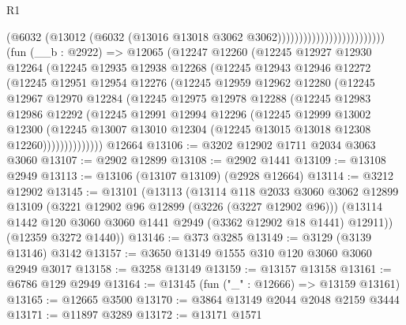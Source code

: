 \begin{lexlean}{R1}
\begin{coremodule}
                                              (@6032
                                                (@13012
                                                  (@6032
                                                    (@13016
                                                      @13018
                                                      @3062
                                                      @3062)))))))))))))))))))))))))
    (fun (__b : @2922) =>
    @12065
      (@12247
        @12260
        (@12245
          @12927
          @12930
          @12264
          (@12245
            @12935
            @12938
            @12268
            (@12245
              @12943
              @12946
              @12272
              (@12245
                @12951
                @12954
                @12276
                (@12245
                  @12959
                  @12962
                  @12280
                  (@12245
                    @12967
                    @12970
                    @12284
                    (@12245
                      @12975
                      @12978
                      @12288
                      (@12245
                        @12983
                        @12986
                        @12292
                        (@12245
                          @12991
                          @12994
                          @12296
                          (@12245
                            @12999
                            @13002
                            @12300
                            (@12245
                              @13007
                              @13010
                              @12304
                              (@12245 @13015 @13018 @12308 @12260))))))))))))))
    @12664
@13106 := @3202 @12902 @1711 @2034 @3063 @3060
@13107 := @2902 @12899
@13108 := @2902 @1441
@13109 := @13108 @2949
@13113 := @13106 (@13107 @13109) (@2928 @12664)
@13114 := @3212 @12902
@13145 := @13101
    (@13113
      (@13114
        @118
        @2033
        @3060
        @3062
        @12899
        @13109
        (@3221 @12902 @96 @12899 (@3226 (@3227 @12902 @96)))
        (@13114 @1442 @120 @3060 @3060 @1441 @2949 (@3362 @12902 @18 @1441) @12911))
      (@12359 @3272 @1440))
@13146 := @373 @3285
@13149 := @3129 (@3139 @13146) @3142
@13157 := @3650 @13149 @1555 @310 @120 @3060 @3060 @2949 @3017
@13158 := @3258 @13149
@13159 := @13157 @13158
@13161 := @6786 @129 @2949
@13164 := @13145 (fun ("_" : @12666) => @13159 @13161)
@13165 := @12665 @3500
@13170 := @3864 @13149 @2044 @2048 @2159 @3444
@13171 := @11897 @3289
@13172 := @13171 @1571

\end{coremodule}
\end{lexlean}
